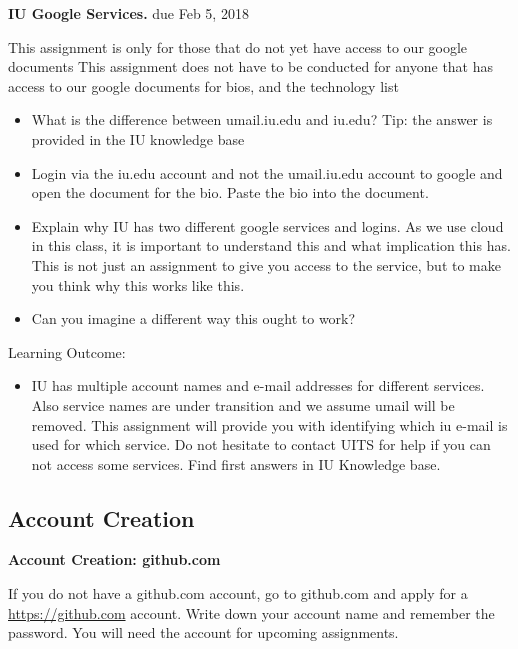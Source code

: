 \begin{exercise}\label{E:e222-iu-google}

  {\bf IU Google Services.} due Feb 5, 2018
  
  This assignment is only for those that do
  not yet have access to our google documents This assignment does not
  have to be conducted for anyone that has access to our google
  documents for bios, and the technology list

  \begin{itemize}
 
  \item What is the difference between umail.iu.edu and iu.edu? Tip:
    the answer is provided in the IU knowledge base

  \item Login via the iu.edu account and not the umail.iu.edu account
    to google and open the document for the bio. Paste the bio into
    the document.

  \item Explain why IU has two different google services and
    logins. As we use cloud in this class, it is important to
    understand this and what implication this has. This is not just an
    assignment to give you access to the service, but to make you
    think why this works like this.

  \item Can you imagine a different way this ought to work?

  \end{itemize}

Learning Outcome:

\begin{itemize}
\item IU has multiple account names and e-mail addresses for different
  services. Also service names are under transition and we assume
  umail will be removed. This assignment will provide you with
  identifying which iu e-mail is used for which service. Do not
  hesitate to contact UITS for help if you can not access some
  services. Find first answers in IU Knowledge base.
\end{itemize}
\end{exercise}


\subsection{Account Creation}

\begin{exercise}

  {\bf Account Creation: github.com}
  
  If you do not have a github.com
  account, go to github.com and apply for a \url{https://github.com}
  account. Write down your account name and remember the password. You
  will need the account for upcoming assignments.

\end{exercise}

